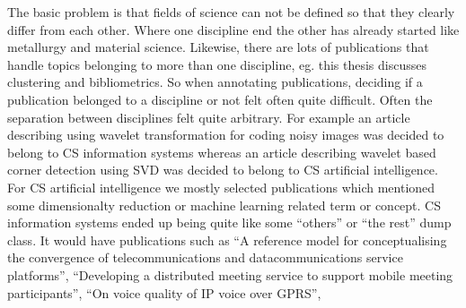 The basic problem is that fields of science can not be 
defined so that they clearly differ from each other. Where one 
discipline end the other has already started like metallurgy and 
material science. Likewise, there are lots of publications that 
handle topics belonging to more than one discipline, eg. this 
thesis discusses clustering and bibliometrics. So when annotating 
publications, deciding if a publication belonged to
a discipline or not felt often quite difficult. Often the 
separation between disciplines felt quite arbitrary. For example
an article describing using wavelet transformation for coding noisy
images was decided to belong to CS information systems whereas an
article describing wavelet based corner detection using SVD was
decided to belong to CS artificial intelligence.
For CS artificial intelligence we mostly selected publications 
which
mentioned some dimensionalty reduction or machine learning related
term or concept.
CS information systems ended up being quite like some ``others'' 
or
``the rest'' dump class. It would have publications such as
``A reference model for conceptualising the convergence of 
telecommunications and datacommunications service platforms'',
``Developing a distributed meeting service to support mobile 
meeting participants'',
``On voice quality of IP voice over GPRS'',
